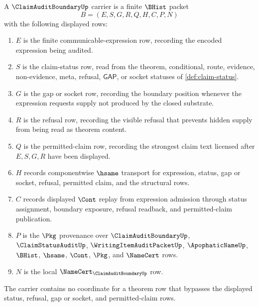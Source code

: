 \begin{definition}
\label{def:claim-audit-boundary-carrier}
A $\ClaimAuditBoundaryUp$ carrier is a finite $\BHist$ packet
$$
B=(E,S,G,R,Q,H,C,P,N)
$$
with the following displayed rows:
\begin{enumerate}
\item $E$ is the finite communicable-expression row, recording the encoded expression being audited.
\item $S$ is the claim-status row, read from the theorem, conditional, route, evidence, non-evidence, meta, refusal, $\mathsf{GAP}$, or socket statuses of \autoref{def:claim-status}.
\item $G$ is the gap or socket row, recording the boundary position whenever the expression requests supply not produced by the closed substrate.
\item $R$ is the refusal row, recording the visible refusal that prevents hidden supply from being read as theorem content.
\item $Q$ is the permitted-claim row, recording the strongest claim text licensed after $E,S,G,R$ have been displayed.
\item $H$ records componentwise $\hsame$ transport for expression, status, gap or socket, refusal, permitted claim, and the structural rows.
\item $C$ records displayed $\Cont$ replay from expression admission through status assignment, boundary exposure, refusal readback, and permitted-claim publication.
\item $P$ is the $\Pkg$ provenance over $\ClaimAuditBoundaryUp$, $\ClaimStatusAuditUp$, $\WritingItemAuditPacketUp$, $\ApophaticNameUp$, $\BHist$, $\hsame$, $\Cont$, $\Pkg$, and $\NameCert$ rows.
\item $N$ is the local $\NameCert_{\ClaimAuditBoundaryUp}$ row.
\end{enumerate}
The carrier contains no coordinate for a theorem row that bypasses the displayed status, refusal, gap or socket, and permitted-claim rows.
\end{definition}


